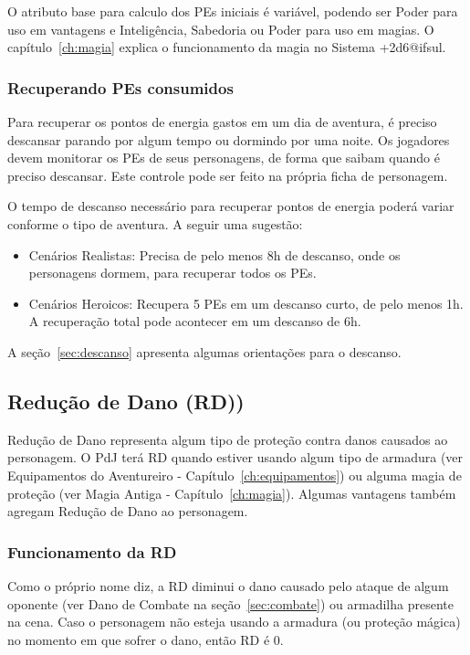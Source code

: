 O atributo base para calculo dos PEs iniciais é variável, podendo ser Poder para uso em vantagens e Inteligência, Sabedoria ou Poder para uso em magias. O capítulo~\ref{ch:magia} explica o funcionamento da magia no Sistema +2d6@ifsul.

\subsubsection*{Recuperando PEs consumidos}
Para recuperar os pontos de energia gastos em um dia de aventura, é preciso descansar parando por algum tempo ou dormindo por uma noite. Os jogadores devem monitorar os PEs de seus personagens, de forma que saibam quando é preciso descansar. Este controle pode ser feito na própria ficha de personagem. 

O tempo de descanso necessário para recuperar pontos de energia poderá variar conforme o tipo de aventura. A seguir uma sugestão:
\begin{itemize}
	\item Cenários Realistas: Precisa de pelo menos 8h de descanso, onde os personagens dormem, para recuperar todos os PEs.
	\item Cenários Heroicos: Recupera 5 PEs em um descanso curto, de pelo menos 1h. A recuperação total pode acontecer em um descanso de 6h.
\end{itemize}

A seção~\ref{sec:descanso} apresenta algumas orientações para o descanso.

\subsection{Redução de Dano (RD))}
Redução de Dano representa algum tipo de proteção contra danos causados ao personagem. O PdJ terá RD quando estiver usando algum tipo de armadura (ver Equipamentos do Aventureiro - Capítulo~\ref{ch:equipamentos}) ou alguma magia de proteção (ver Magia Antiga - Capítulo~\ref{ch:magia}). Algumas vantagens também agregam Redução de Dano ao personagem.

\subsubsection*{Funcionamento da RD}
Como o próprio nome diz, a RD diminui o dano causado pelo ataque de algum oponente (ver Dano de Combate na seção~\ref{sec:combate}) ou armadilha presente na cena. Caso o personagem não esteja usando a armadura (ou proteção mágica) no momento em que sofrer o dano, então RD é 0. 

